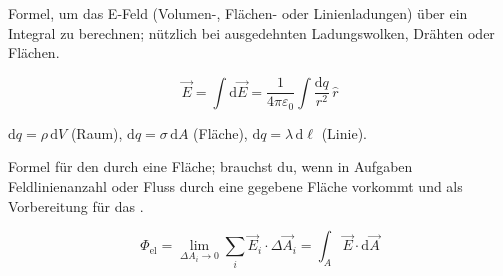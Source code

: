 \begin{minipage}{\linewidth}
\begin{runintext}
Formel, um das E-Feld  (Volumen-, Flächen- oder Linienladungen) über ein Integral zu berechnen; nützlich bei ausgedehnten Ladungswolken, Drähten oder Flächen.
\end{runintext}
\begin{formulabox}
\[ \vec{E} = \int \mathrm{d}\vec{E} = \frac{1}{4\pi\varepsilon_0} \int \frac{\mathrm{d}q}{r^2}\,\hat{r} \]
\end{formulabox}
\begin{runintext}
$\mathrm{d}q = \rho\,\mathrm{d}V$ (Raum), $\mathrm{d}q = \sigma\,\mathrm{d}A$ (Fläche), $\mathrm{d}q = \lambda\,\mathrm{d}\ell$ (Linie).
\end{runintext}
\end{minipage}

\begin{runintext}
Formel für den  durch eine Fläche; brauchst du, wenn in Aufgaben Feldlinienanzahl oder Fluss durch eine gegebene Fläche vorkommt und als Vorbereitung für das .
\end{runintext}
\begin{formulabox}
\[ \Phi_{\mathrm{el}} = \lim_{\Delta A_i\to 0} \sum_i \vec{E}_i\cdot\Delta\vec{A}_i = \int_A \vec{E}\cdot\mathrm{d}\vec{A} \]
\end{formulabox}

